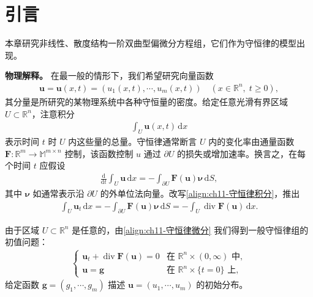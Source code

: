 \documentclass[../../main.tex]{subfiles}
\begin{document}
\section{引言}\label{section:ch11-引言}

本章研究非线性、散度结构一阶双曲型偏微分方程组，它们作为守恒律的模型出现。

\textbf{物理解释。} 在最一般的情形下，我们希望研究向量函数
\begin{align*}
\mathbf{u}=\mathbf{u}(x,t)=(u_1(x,t),\cdots,u_m(x,t)) \quad (x\in\mathbb{R}^n,\;t\geqslant 0),
\end{align*}
其分量是所研究的某物理系统中各种守恒量的密度。给定任意光滑有界区域 $U\subset\mathbb{R}^n$，注意积分
\begin{align}
\int_U \mathbf{u}(x,t)\,\mathrm{d}x
\label{align:ch11-总量}
\end{align}
表示时间 $t$ 时 $U$ 内这些量的总量。守恒律通常断言 $U$ 内的变化率由通量函数 $\mathbf{F}:\mathbb{R}^m\to\mathbb{M}^{m\times n}$ 控制，该函数控制 $u$ 通过 $\partial U$ 的损失或增加速率。换言之，在每个时间 $t$ 应假设
\begin{align}
\frac{\mathrm{d}}{\mathrm{d}t}\int_U \mathbf{u}\,\mathrm{d}x = -\int_{\partial U}\mathbf{F}(\mathbf{u})\boldsymbol{\nu}\,\mathrm{d}S,
\label{align:ch11-守恒律积分}
\end{align}
其中 $\boldsymbol{\nu}$ 如通常表示沿 $\partial U$ 的外单位法向量。改写\eqref{align:ch11-守恒律积分}，推出
\begin{align}
\int_U \mathbf{u}_t\,\mathrm{d}x = -\int_{\partial U}\mathbf{F}(\mathbf{u})\boldsymbol{\nu}\,\mathrm{d}S = -\int_U \operatorname{div}\mathbf{F}(\mathbf{u})\,\mathrm{d}x.
\label{align:ch11-守恒律微分}
\end{align}

由于区域 $U\subset\mathbb{R}^n$ 是任意的，由\eqref{align:ch11-守恒律微分} 我们得到一般守恒律组的初值问题：
\begin{align}
\begin{cases}
\mathbf{u}_t+\operatorname{div}\mathbf{F}(\mathbf{u})=0 & \text{在 } \mathbb{R}^n\times(0,\infty) \text{ 中},\\
\mathbf{u}=\mathbf{g} & \text{在 } \mathbb{R}^n\times\{t=0\} \text{ 上},
\end{cases}
\label{align:ch11-高维守恒律}
\end{align}
给定函数 $\mathbf{g}=(g_1,\cdots,g_m)$ 描述 $\mathbf{u}=(u_1,\cdots,u_m)$ 的初始分布。
\end{document}
